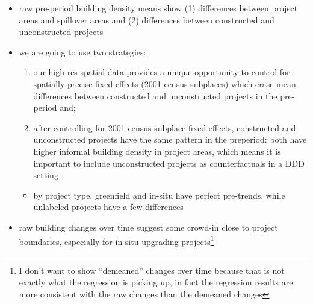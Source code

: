 \documentclass[12pt]{article}
\begin{document}
\begin{itemize}

\item raw pre-period building density means show (1) differences between project areas and spillover areas and (2) differences between constructed and unconstructed projects
\item we are going to use two strategies: 
\begin{enumerate}
\item our high-res spatial data provides a unique opportunity to control for spatially precise fixed effects (2001 census subplaces) which erase mean differences between constructed and unconstructed projects in the pre-period and;
\item after controlling for 2001 census subplace fixed effects, constructed and unconstructed projects have the same pattern in the preperiod: both have higher informal building density in project areas, which means it is important to include unconstructed projects as counterfactuals in a DDD setting
\end{enumerate}
	\begin{itemize}
		\item by project type, greenfield and in-situ have perfect pre-trends, while unlabeled projects have a few differences
	\end{itemize}
\item raw building changes over time suggest some crowd-in close to project boundaries, especially for in-situ upgrading projects\footnote{I don't want to show ``demeaned'' changes over time because that is not exactly what the regression is picking up, in fact the regression results are more consistent with the raw changes than the demeaned changes}


\end{itemize}
\end{document}
